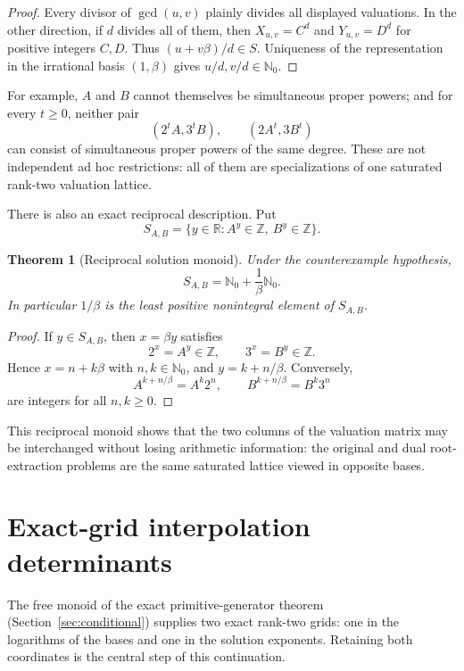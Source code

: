 \documentclass[11pt,oneside]{article}
\newtheorem{theorem}{Theorem}[section]
\theoremstyle{definition}
\theoremstyle{remark}
\begin{document}
\begin{proof}
Every divisor of $\gcd(u,v)$ plainly divides all displayed valuations.  In the
other direction, if $d$ divides all of them, then
$X_{u,v}=C^d$ and $Y_{u,v}=D^d$ for positive integers $C,D$.  Thus
$(u+v\beta)/d\in S$.  Uniqueness of the representation in the irrational
basis $(1,\beta)$ gives $u/d,v/d\in\mathbb N_0$.
\end{proof}

For example, $A$ and $B$ cannot themselves be simultaneous proper powers; and
for every $t\ge0$, neither pair
\[
  (2^tA,3^tB),\qquad (2A^t,3B^t)
\]
can consist of simultaneous proper powers of the same degree.  These are not
independent ad hoc restrictions: all of them are specializations of one
saturated rank-two valuation lattice.

There is also an exact reciprocal description.  Put
\[
 S_{A,B}=\{y\in\mathbb R:A^y\in\mathbb Z,
                              \ B^y\in\mathbb Z\}.
\]

\begin{theorem}[Reciprocal solution monoid]
\label{thm:reciprocal-monoid}
Under the counterexample hypothesis,
\[
  S_{A,B}=\mathbb N_0+\frac1\beta\mathbb N_0.
\]
In particular $1/\beta$ is the least positive nonintegral element of
$S_{A,B}$.
\end{theorem}

\begin{proof}
If $y\in S_{A,B}$, then $x=\beta y$ satisfies
\[
  2^x=A^y\in\mathbb Z,
  \qquad
  3^x=B^y\in\mathbb Z.
\]
Hence $x=n+k\beta$ with $n,k\in\mathbb N_0$, and
$y=k+n/\beta$.  Conversely,
\[
 A^{k+n/\beta}=A^k2^n,
 \qquad
 B^{k+n/\beta}=B^k3^n
\]
are integers for all $n,k\ge0$.
\end{proof}

This reciprocal monoid shows that the two columns of the valuation matrix may
be interchanged without losing arithmetic information: the original and dual
root-extraction problems are the same saturated lattice viewed in opposite
bases.


\section{Exact-grid interpolation determinants}

The free monoid of the exact primitive-generator theorem
(Section~\ref{sec:conditional}) supplies two exact
rank-two grids: one in the logarithms of the bases and one in the solution
exponents.  Retaining both coordinates is the central step of this
continuation.
\end{document}
